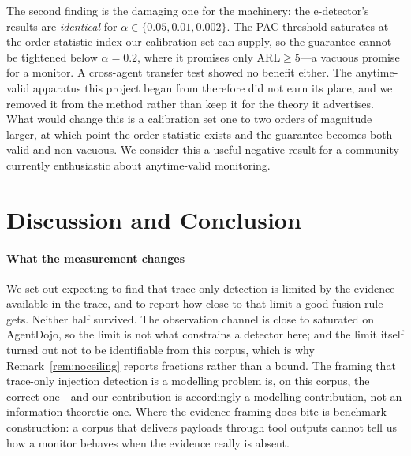 \documentclass[preprint,12pt,authoryear]{elsarticle}
\theoremstyle{definition}
\begin{document}
The second finding is the damaging one for the machinery: the e-detector's results
are \emph{identical} for $\alpha \in \{0.05, 0.01, 0.002\}$. The PAC threshold
saturates at the order-statistic index our calibration set can supply, so the
guarantee cannot be tightened below $\alpha = 0.2$, where it promises only
$\mathrm{ARL} \ge 5$---a vacuous promise for a monitor. A cross-agent transfer test
showed no benefit either. The anytime-valid apparatus this project began from
therefore did not earn its place, and we removed it from the method rather than
keep it for the theory it advertises. What would change this is a calibration set
one to two orders of magnitude larger, at which point the order statistic exists
and the guarantee becomes both valid and non-vacuous. We consider this a useful negative
result for a community currently enthusiastic about anytime-valid monitoring.

\section{Discussion and Conclusion}\label{sec:discussion}

\paragraph{What the measurement changes} We set out expecting to find that
trace-only detection is limited by the evidence available in the trace, and to
report how close to that limit a good fusion rule gets. Neither half survived. The
observation channel is close to saturated on AgentDojo, so the limit is not what
constrains a detector here; and the limit itself turned out not to be identifiable
from this corpus, which is why Remark~\ref{rem:noceiling} reports fractions rather
than a bound. The framing that trace-only injection detection is a modelling
problem is, on this corpus, the correct one---and our contribution is accordingly a
modelling contribution, not an information-theoretic one. Where the evidence framing
does bite is benchmark construction: a corpus that delivers payloads through tool
outputs cannot tell us how a monitor behaves when the evidence really is absent.
\end{document}
